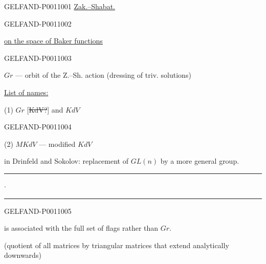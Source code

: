 \begin{GelfandAdjacentEvidence}{GELFAND-P001100}{1}
\underline{Zak.–Shabat.}
\end{GelfandAdjacentEvidence}
\begin{GelfandAdjacentEvidence}{GELFAND-P001100}{2}



\qquad \underline{on the space of Baker functions}
\end{GelfandAdjacentEvidence}
\begin{GelfandAdjacentEvidence}{GELFAND-P001100}{3}


$Gr$ — orbit of the Z.–Sh. action (dressing of triv. solutions)

\underline{List of names:}

(1) $Gr$ [\sout{KdV?}] and $KdV$
\end{GelfandAdjacentEvidence}
\begin{GelfandAdjacentEvidence}{GELFAND-P001100}{4}


(2) $MKdV$ — modified $KdV$

in Drinfeld and Sokolov: replacement of $GL(n)$ by a more general group.

\begin{center}\rule{12mm}{0.3pt}\quad $\cdot$\quad\rule{12mm}{0.3pt}\end{center}
\end{GelfandAdjacentEvidence}
\begin{GelfandAdjacentEvidence}{GELFAND-P001100}{5}


 is associated with the full set of flags rather than $Gr$.

(quotient of all matrices by triangular matrices that extend analytically downwards)

\end{GelfandAdjacentEvidence}
